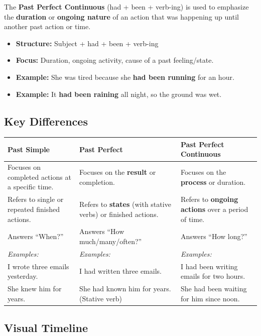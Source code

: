 The \textbf{Past Perfect Continuous} (had + been + verb-ing) is used to emphasize the \textbf{duration} or \textbf{ongoing nature} of an action that was happening up until another past action or time.

\begin{itemize}
    \item \textbf{Structure:} Subject + had + been + verb-ing
    \item \textbf{Focus:} Duration, ongoing activity, cause of a past feeling/state.
    \item \textbf{Example:} She was tired because she \textbf{had been running} for an hour.
    \item \textbf{Example:} It \textbf{had been raining} all night, so the ground was wet.
\end{itemize}

\subsection{Key Differences}

\begin{longtable}{|p{4.5cm}|p{4.5cm}|p{4.5cm}|}
    \hline
    \textbf{Past Simple} & \textbf{Past Perfect} & \textbf{Past Perfect Continuous} \\ \hline
    \endhead
    Focuses on completed actions at a specific time. & Focuses on the \textbf{result} or completion. & Focuses on the \textbf{process} or duration. \\ \hline
    Refers to single or repeated finished actions. & Refers to \textbf{states} (with stative verbs) or finished actions. & Refers to \textbf{ongoing actions} over a period of time. \\ \hline
    Answers ``When?'' & Answers ``How much/many/often?'' & Answers ``How long?'' \\ \hline
    \textit{Examples:} & \textit{Examples:} & \textit{Examples:} \\
    I wrote three emails yesterday. & I had written three emails. & I had been writing emails for two hours. \\
    She knew him for years. & She had known him for years. (Stative verb) & She had been waiting for him since noon. \\ \hline
\end{longtable}

\subsection{Visual Timeline}

